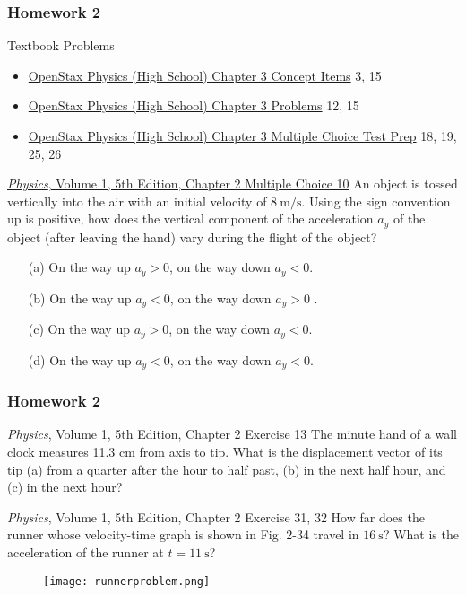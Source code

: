 \documentclass[20pt]{beamer}
\begin{document}
\begin{frame}
	\frametitle{Homework 2}
	\begin{block}{Textbook Problems}
		\begin{itemize}
			\item \href{https://openstax.org/books/physics/pages/3-concept-items}{OpenStax Physics (High School) Chapter 3 Concept Items} 3, 15
			\item \href{https://openstax.org/books/physics/pages/3-problems}{OpenStax Physics (High School) Chapter 3 Problems} 12, 15
			\item \href{https://openstax.org/books/physics/pages/3-multiple-choice}{OpenStax Physics (High School) Chapter 3 Multiple Choice Test Prep} 18, 19, 25, 26
		\end{itemize}
	\end{block}
	\begin{block}{
			\href{https://www.wiley.com/en-us/Physics\%2C+Volume+1\%2C+5th+Edition-p-9780471320579}{\textit{Physics}, Volume 1, 5th Edition, Chapter 2 Multiple Choice 10}}
		An object is tossed vertically into the air with an initial velocity of $\SI{8}{\meter/\second}$. Using the sign convention up is positive, how does the vertical component of the acceleration $a_y$ of the object (after leaving the hand) vary during the flight of the object?
		\begin{enumerate}
			\item[(a)] On the way up $a_y > 0$, on the way down $a_y < 0$.
			\item[(b)] On the way up $a_y < 0$, on the way down $a_y > 0$ .
			\item[(c)] On the way up $a_y > 0$, on the way down $a_y < 0$.
			\item[(d)] On the way up $a_y < 0$, on the way down $a_y < 0$.
		\end{enumerate}
	\end{block}
\end{frame}

\begin{frame}
	\frametitle{Homework 2}
	\begin{block}{\textit{Physics}, Volume 1, 5th Edition, Chapter 2 Exercise 13}
		The minute hand of a wall clock measures 11.3 cm from axis to tip. What is the displacement vector of its tip (a) from a quarter after the hour to half past, (b) in the next half hour, and (c) in the next hour?
	\end{block}

	\begin{block}{\textit{Physics}, Volume 1, 5th Edition, Chapter 2 Exercise 31, 32}
		How far does the runner whose velocity-time graph is shown in Fig. 2-34 travel in $\SI{16}{\second}$? What is the acceleration of the runner at $t = \SI{11}{\second}$?
		\begin{figure}[ht]
			\centering
			\texttt{[image: runnerproblem.png]}
			\label{fig:runnerproblem}
		\end{figure}
	\end{block}
\end{frame}
\end{document}
